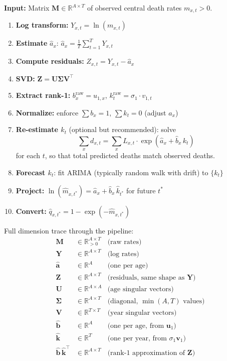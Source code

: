 \documentclass[11pt,a4paper]{article}
\begin{document}
\begin{application}
\textbf{Input:} Matrix $\bm{M} \in \mathbb{R}^{A \times T}$ of observed central death rates $m_{x,t} > 0$.

\begin{enumerate}[nosep]
\item \textbf{Log transform:} $Y_{x,t} = \ln(m_{x,t})$
\item \textbf{Estimate} $\hat{a}_x$: $\hat{a}_x = \frac{1}{T}\sum_{t=1}^{T} Y_{x,t}$
\item \textbf{Compute residuals:} $Z_{x,t} = Y_{x,t} - \hat{a}_x$
\item \textbf{SVD:} $\bm{Z} = \bm{U}\bm{\Sigma}\bm{V}^\top$
\item \textbf{Extract rank-1:} $b_x^{\text{raw}} = u_{1,x}$, \; $k_t^{\text{raw}} = \sigma_1 \cdot v_{1,t}$
\item \textbf{Normalize:} enforce $\sum b_x = 1$, $\sum k_t = 0$ (adjust $a_x$)
\item \textbf{Re-estimate $k_t$} (optional but recommended): solve
\[
\sum_x d_{x,t} = \sum_x L_{x,t} \cdot \exp(\hat{a}_x + \hat{b}_x \, k_t)
\]
for each $t$, so that total predicted deaths match observed deaths.
\item \textbf{Forecast $k_t$}: fit ARIMA (typically random walk with drift) to $\{k_t\}$
\item \textbf{Project:} $\ln(\hat{m}_{x,t^*}) = \hat{a}_x + \hat{b}_x \, \hat{k}_{t^*}$ for future $t^*$
\item \textbf{Convert:} $\hat{q}_{x,t^*} = 1 - \exp(-\hat{m}_{x,t^*})$
\end{enumerate}
\end{application}

\begin{dimcheck}
Full dimension trace through the pipeline:
\begin{align*}
\bm{M} &\in \mathbb{R}^{A \times T}_{>0}  & \text{(raw rates)} \\
\bm{Y} &\in \mathbb{R}^{A \times T}        & \text{(log rates)} \\
\hat{\bm{a}} &\in \mathbb{R}^{A}           & \text{(one per age)} \\
\bm{Z} &\in \mathbb{R}^{A \times T}        & \text{(residuals, same shape as } \bm{Y}\text{)} \\
\bm{U} &\in \mathbb{R}^{A \times A}        & \text{(age singular vectors)} \\
\bm{\Sigma} &\in \mathbb{R}^{A \times T}   & \text{(diagonal, } \min(A,T) \text{ values)} \\
\bm{V} &\in \mathbb{R}^{T \times T}        & \text{(year singular vectors)} \\
\hat{\bm{b}} &\in \mathbb{R}^{A}           & \text{(one per age, from } \bm{u}_1\text{)} \\
\hat{\bm{k}} &\in \mathbb{R}^{T}           & \text{(one per year, from } \sigma_1 \bm{v}_1\text{)} \\
\hat{\bm{b}} \, \hat{\bm{k}}^\top &\in \mathbb{R}^{A \times T} & \text{(rank-1 approximation of } \bm{Z}\text{)}
\end{align*}
\end{dimcheck}
\end{document}
